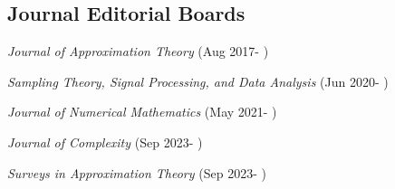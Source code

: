 \documentclass[11pt]{article}
\begin{document}
\subsection{Journal Editorial Boards}

\bitemize
\item
{\sl Journal of Approximation Theory} (Aug 2017- )
\item
{\sl Sampling Theory, Signal Processing, and Data Analysis} (Jun 2020- )
\item
{\sl Journal of Numerical Mathematics} (May 2021- )
\item 
{\sl Journal of Complexity} (Sep 2023- )
\item 
{\sl Surveys in Approximation Theory} (Sep 2023- )
\eitemize

%
 
\end{document}
